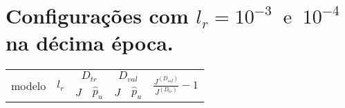 

\chapter{Configurações com $l_r = 10^{-3} \;\; \text{e} \;\; 10^{-4}$ na décima época.}\label{cap:apendiceA}

\begin{tiny}

\begin{table}[H]
	\begin{center}
		\begin{tabular}{ |c|c|c|c|c|c|c| }
			
			\hline
			\multirow{2}{*}{modelo} & 
			\multirow{2}{*}{$l_r$} & 
			\multicolumn{2}{c|}{$D_{tr}$} &
			\multicolumn{2}{c|}{$D_{val}$} &
			\multirow{2}{*}{$\frac{J^{(D_{val})}}{J^{(D_{tr})}} - 1$}   \\ \cline{3-6}
			&  & $J$ & $\hat{p}_u$ & $J$ & $\hat{p}_u$  &  \\[2pt]
			

\end{tabular}
\end{center}
\end{table}
\end{tiny}
